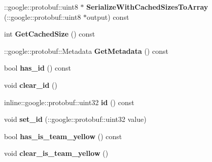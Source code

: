 \begin{DoxyCompactItemize}
\item 
\+::google\+::protobuf\+::uint8 $\ast$ {\bfseries Serialize\+With\+Cached\+Sizes\+To\+Array} (\+::google\+::protobuf\+::uint8 $\ast$output) const \hypertarget{classvss__command_1_1Global__Commands_a124cdc7e8bf7200c9f11c801cbcaa9d4}{}\label{classvss__command_1_1Global__Commands_a124cdc7e8bf7200c9f11c801cbcaa9d4}

\item 
int {\bfseries Get\+Cached\+Size} () const \hypertarget{classvss__command_1_1Global__Commands_a87d23baa19f2c0272a75e15dfa234f08}{}\label{classvss__command_1_1Global__Commands_a87d23baa19f2c0272a75e15dfa234f08}

\item 
\+::google\+::protobuf\+::\+Metadata {\bfseries Get\+Metadata} () const \hypertarget{classvss__command_1_1Global__Commands_ae82e1f8fbfdf6f364c915da6d0e12f33}{}\label{classvss__command_1_1Global__Commands_ae82e1f8fbfdf6f364c915da6d0e12f33}

\item 
bool {\bfseries has\+\_\+id} () const \hypertarget{classvss__command_1_1Global__Commands_a70a923cca7611e0bd3c322a1ac5e91ba}{}\label{classvss__command_1_1Global__Commands_a70a923cca7611e0bd3c322a1ac5e91ba}

\item 
void {\bfseries clear\+\_\+id} ()\hypertarget{classvss__command_1_1Global__Commands_a32c51afe77b984a2be61e786893dd382}{}\label{classvss__command_1_1Global__Commands_a32c51afe77b984a2be61e786893dd382}

\item 
inline\+::google\+::protobuf\+::uint32 {\bfseries id} () const \hypertarget{classvss__command_1_1Global__Commands_ac4b50f174ae21e1ef747b8d2498d9651}{}\label{classvss__command_1_1Global__Commands_ac4b50f174ae21e1ef747b8d2498d9651}

\item 
void {\bfseries set\+\_\+id} (\+::google\+::protobuf\+::uint32 value)\hypertarget{classvss__command_1_1Global__Commands_aba49ba26507d3a54403584352f3dde90}{}\label{classvss__command_1_1Global__Commands_aba49ba26507d3a54403584352f3dde90}

\item 
bool {\bfseries has\+\_\+is\+\_\+team\+\_\+yellow} () const \hypertarget{classvss__command_1_1Global__Commands_a01e1a3bf6986a61900153eec4e51ac9b}{}\label{classvss__command_1_1Global__Commands_a01e1a3bf6986a61900153eec4e51ac9b}

\item 
void {\bfseries clear\+\_\+is\+\_\+team\+\_\+yellow} ()\hypertarget{classvss__command_1_1Global__Commands_ad626702bff23b842c6c342fb94ed9097}{}\label{classvss__command_1_1Global__Commands_ad626702bff23b842c6c342fb94ed9097}


\end{DoxyCompactItemize}
